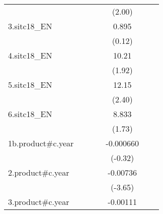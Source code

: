 {\begin{tabular}{l*{6}{c}}
                    &                     &                     &                     &      (2.00)         &                     &                     \\
[1em]
3.sitc18\_EN         &                     &                     &                     &       0.895         &                     &                     \\
                    &                     &                     &                     &      (0.12)         &                     &                     \\
[1em]
4.sitc18\_EN         &                     &                     &                     &       10.21         &                     &                     \\
                    &                     &                     &                     &      (1.92)         &                     &                     \\
[1em]
5.sitc18\_EN         &                     &                     &                     &       12.15\sym{*}  &                     &                     \\
                    &                     &                     &                     &      (2.40)         &                     &                     \\
[1em]
6.sitc18\_EN         &                     &                     &                     &       8.833         &                     &                     \\
                    &                     &                     &                     &      (1.73)         &                     &                     \\
[1em]
1b.product#c.year   &                     &                     &                     &   -0.000660         &                     &                     \\
                    &                     &                     &                     &     (-0.32)         &                     &                     \\
[1em]
2.product#c.year    &                     &                     &                     &    -0.00736\sym{***}&                     &                     \\
                    &                     &                     &                     &     (-3.65)         &                     &                     \\
[1em]
3.product#c.year    &                     &                     &                     &    -0.00111         &                     &                     \\

\end{tabular}}
